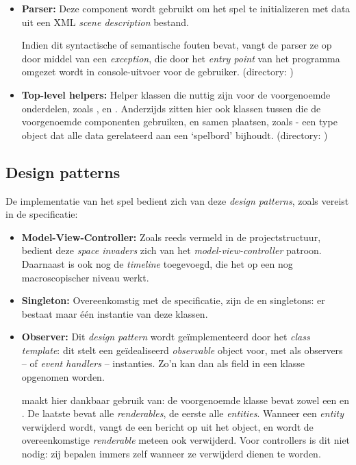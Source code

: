 \documentclass[10pt,a4paper]{article}
\begin{document}
\begin{itemize}
\item \textbf{Parser:} Deze component wordt gebruikt om het spel te 
initializeren met data uit een XML \emph{scene description} bestand.

Indien dit syntactische of semantische fouten bevat, vangt
de parser ze op door middel van een \emph{exception}, die door het
\emph{entry point} van het programma omgezet wordt in console-uitvoer
voor de gebruiker.
(directory: )

\item \textbf{Top-level helpers:} Helper klassen die nuttig zijn voor de 
voorgenoemde onderdelen, zoals ,  en . 
Anderzijds zitten hier ook klassen tussen die de voorgenoemde componenten
gebruiken, en samen plaatsen, zoals  - een type object
dat alle data gerelateerd aan een `spelbord' bijhoudt.
(directory: )

\end{itemize}

\subsection{Design patterns}

De implementatie van het spel bedient zich van deze \emph{design patterns}, zoals vereist in de specificatie:

\begin{itemize}
	
\item \textbf{Model-View-Controller:} Zoals reeds vermeld in de 
projectstructuur,
bedient deze \emph{space invaders} zich van het \emph{model-view-controller}
patroon. Daarnaast is ook nog de \emph{timeline} toegevoegd, die het op een
nog macroscopischer niveau werkt.

\item \textbf{Singleton:} Overeenkomstig met de specificatie, zijn 
de  en  singletons: er bestaat maar \'e\'en instantie van deze klassen.

\item \textbf{Observer:} Dit \emph{design pattern} wordt ge\"implementeerd
door het  \emph{class template}: dit stelt een 
ge\"idealiseerd \emph{observable} object voor, met als 
observers -- of \emph{event handlers} -- 
 instanties. 
Zo'n  kan dan als field in een klasse opgenomen worden. 

 maakt hier dankbaar gebruik van: de voorgenoemde 
klasse bevat zowel een  en . 
De laatste bevat alle \emph{renderables}, de eerste alle \emph{entities}.
Wanneer een \emph{entity} verwijderd wordt, vangt de 
een bericht op uit het  object, en wordt de overeenkomstige
\emph{renderable} meteen ook verwijderd. Voor controllers is dit niet nodig:
zij bepalen immers zelf wanneer ze verwijderd dienen te worden.


\end{itemize}
\end{document}
